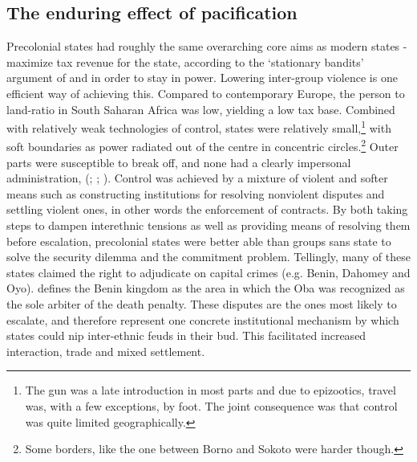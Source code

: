 \subsection{The enduring effect of pacification} 
\label{The enduring effect of pacification}

Precolonial states had roughly the same overarching core aims as modern states -
maximize tax revenue for the state, according to the `stationary bandits'
argument of \citet{tilly_1985} and \citet{Olson1993} in order to stay in power.
Lowering inter-group violence is one efficient way of achieving this. Compared
to contemporary Europe, the person to land-ratio in South Saharan Africa was
low, yielding a low tax base. Combined with relatively weak technologies of
control, states were relatively small,\footnote{The gun was a late introduction
in most parts and due to epizootics, travel was, with a few exceptions, by foot.
The joint consequence was that control was quite limited geographically.} with
soft boundaries as power radiated out of the centre in concentric
circles.\footnote{Some borders, like the one between Borno and Sokoto were
harder though.} Outer parts were susceptible to break off, and none had a
clearly impersonal administration, (\citealp[20]{englebert2013inside};
\citealp{Herbst2014}; \citealp[135]{tibebu1995making}). Control was achieved by
a mixture of violent and softer means such as constructing institutions for
resolving nonviolent disputes and settling violent ones, in other words the
enforcement of contracts. By both taking steps to dampen interethnic tensions as
well as providing means of resolving them before escalation, precolonial states
were better able than groups sans state to solve the security dilemma and the
commitment problem. Tellingly, many of these states claimed the right to
adjudicate on capital crimes (e.g. Benin, Dahomey and Oyo).
\citet[3-4]{BradburyR.E1970TBka} defines the Benin kingdom as the area in which
the Oba was recognized as the sole arbiter of the death penalty. These disputes
are the ones most likely to escalate, and therefore represent one concrete
institutional mechanism by which states could nip inter-ethnic feuds in their
bud. This facilitated increased interaction, trade and mixed settlement.

